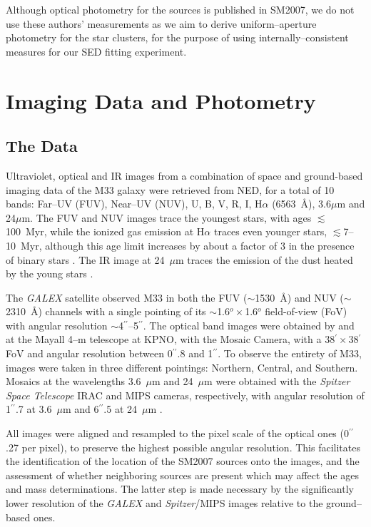 \documentclass{aastex63}
\begin{document}
Although optical photometry for the sources is  published in SM2007, we do not use these authors' measurements as we aim to derive uniform--aperture photometry for the star clusters, for the purpose of using  internally--consistent measures for our SED fitting experiment. 


\section{Imaging Data and Photometry} \label{sec:data}

\subsection{The Data}
Ultraviolet, optical and IR images from a combination of space and ground-based imaging data of the M33 galaxy were retrieved from NED, for a total of 10 bands: Far--UV (FUV), Near--UV (NUV), U, B, V, R, I, H$\alpha$ (6563~\r{A}), 3.6$\mu$m and 24$\mu$m. The FUV and NUV images trace the youngest stars, with ages $\lesssim$100~Myr, while the ionized gas emission at H$\alpha$ traces even younger stars, $\lesssim$7--10~Myr, although this age limit increases by about a factor of 3 in the presence of binary stars \citep{Xiao+2018}. The IR image at 24~$\mu$m traces the emission of the dust heated by the young stars \citep{DraineLi2007, Calzetti+2007}.  

The \textit{GALEX} satellite \citep{Martin+2005} observed M33 in both the FUV ($\sim$1530~\r{A}) and NUV ($\sim$2310~\r{A}) channels with a single pointing of its $\sim$1.6$^o\times$1.6$^o$ field-of-view (FoV) with angular resolution $\sim$4$^{\prime\prime}$--5$^{\prime\prime}$\citep[e.g.,][]{Dale+2009}. The optical band images were obtained by \citet[][for U, B, V, R, and I]{Massey+2006} and \citet[][for H$\alpha$]{Massey+2007} at the Mayall 4--m telescope at KPNO, with the Mosaic Camera, with a 38$^{\prime}\times$38$^{\prime}$ FoV and angular resolution between 0$^{\prime\prime}$.8 and 1$^{\prime\prime}$. To observe the entirety of M33, images were taken in three different pointings: Northern, Central, and Southern. Mosaics at the wavelengths 3.6~$\mu$m and 24~$\mu$m were obtained with the \textit{Spitzer Space Telescope} IRAC and MIPS cameras, respectively, with angular resolution of 1$^{\prime\prime}$.7 at 3.6~$\mu$m and 6$^{\prime\prime}$.5 at 24~$\mu$m \citep{Fazio+2004, Rieke+2004}.

All images were aligned and resampled to the pixel scale of the optical ones (0$^{\prime\prime}$.27 per pixel), to preserve the highest possible angular resolution. This facilitates the identification of the location of the SM2007 sources onto the images, and the assessment of whether neighboring sources are present which may affect the ages and mass determinations. The latter step is made necessary by the significantly lower resolution of the \textit{GALEX} and \textit{Spitzer}/MIPS images relative to the ground--based ones.
\end{document}

